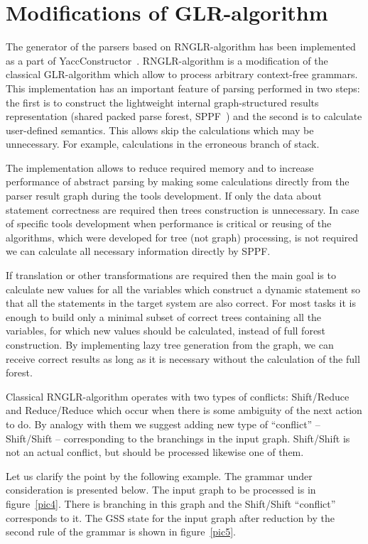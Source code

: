 \documentclass{acm_proc_article-sp}
\begin{document}
\section{Modifications of GLR-algorithm}

The generator of the parsers based on RNGLR-algorithm has been implemented as a part of  YaccConstructor~\cite{AvdiukhinCourseGLR}. RNGLR-algorithm is a modification of the classical GLR-algorithm which allow to process arbitrary context-free grammars.  This implementation has an important feature of parsing performed in two steps:  the first is to construct the lightweight internal graph-structured results representation (shared packed parse forest, SPPF~\cite{Scott:2006:RNG:1146809.1146810}) and the second is to calculate user-defined semantics. This allows skip the calculations which may be unnecessary. For example, calculations in the erroneous branch of stack. 

The implementation allows to reduce required memory and to increase performance of abstract parsing by making some calculations directly from the parser result graph during the tools development. If only the data about statement correctness are required then trees construction is unnecessary. In case of specific tools development when performance is critical or reusing of the algorithms, which were developed for tree (not graph) processing, is not required we can calculate all necessary information directly by SPPF.

If translation or other transformations are required then the main goal is to calculate new values for all the variables which construct a dynamic statement so that all the statements in the target system are also correct. For most tasks it is enough to build only a minimal subset of correct trees containing all the variables, for which new values should be calculated, instead of full forest construction. By implementing lazy tree generation from the graph, we can receive correct results as long as it is necessary without the calculation of the full forest.

Classical RNGLR-algorithm operates with two types of conflicts: Shift/Reduce and Reduce/Reduce which occur when there is some ambiguity of the next action to do. By analogy with them we suggest adding new type of ``conflict'' -- Shift/Shift -- corresponding to the branchings in the input graph. Shift/Shift is not an actual conflict, but should be processed likewise one of them. 

Let us clarify the point by the following example. The grammar under consideration is presented below. The input graph to be processed is in figure~\ref{pic4}. There is branching in this graph and the Shift/Shift ``conflict'' corresponds to it. The GSS state for the input graph after reduction by the second rule of the grammar is shown in figure~\ref{pic5}.
\end{document}
